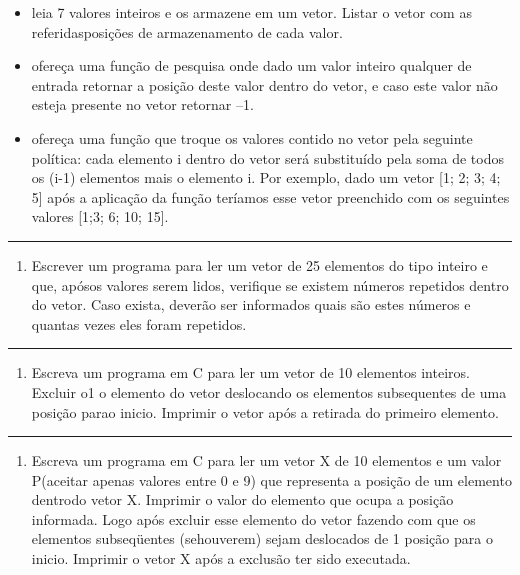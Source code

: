 \documentclass[12pt,a4paper]{article}
\renewcommand{\linethickness}{0.05em}
\providecommand{\tightlist}{%
      \setlength{\itemsep}{0pt}\setlength{\parskip}{0pt}}
\begin{document}
\begin{itemize}
\tightlist
\item
  leia 7 valores inteiros e os armazene em um vetor. Listar o vetor com
  as referidasposições de armazenamento de cada valor.
\item
  ofereça uma função de pesquisa onde dado um valor inteiro qualquer de
  entrada retornar a posição deste valor dentro do vetor, e caso este
  valor não esteja presente no vetor retornar --1.
\item
  ofereça uma função que troque os valores contido no vetor pela
  seguinte política: cada elemento i dentro do vetor será substituído
  pela soma de todos os (i-1) elementos mais o elemento i. Por exemplo,
  dado um vetor {[}1; 2; 3; 4; 5{]} após a aplicação da função teríamos
  esse vetor preenchido com os seguintes valores {[}1;3; 6; 10; 15{]}.
\end{itemize}

    \begin{center}\rule{0.5\linewidth}{\linethickness}\end{center}

\begin{enumerate}
\def\labelenumi{\arabic{enumi}.}
\setcounter{enumi}{17}
\tightlist
\item
  Escrever um programa para ler um vetor de 25 elementos do tipo inteiro
  e que, apósos valores serem lidos, verifique se existem números
  repetidos dentro do vetor. Caso exista, deverão ser informados quais
  são estes números e quantas vezes eles foram repetidos.
\end{enumerate}

    \begin{center}\rule{0.5\linewidth}{\linethickness}\end{center}

\begin{enumerate}
\def\labelenumi{\arabic{enumi}.}
\setcounter{enumi}{18}
\tightlist
\item
  Escreva um programa em C para ler um vetor de 10 elementos inteiros.
  Excluir o1 o elemento do vetor deslocando os elementos subsequentes de
  uma posição parao inicio. Imprimir o vetor após a retirada do primeiro
  elemento.
\end{enumerate}

    \begin{center}\rule{0.5\linewidth}{\linethickness}\end{center}

\begin{enumerate}
\def\labelenumi{\arabic{enumi}.}
\setcounter{enumi}{19}
\tightlist
\item
  Escreva um programa em C para ler um vetor X de 10 elementos e um
  valor P(aceitar apenas valores entre 0 e 9) que representa a posição
  de um elemento dentrodo vetor X. Imprimir o valor do elemento que
  ocupa a posição informada. Logo após excluir esse elemento do vetor
  fazendo com que os elementos subseqüentes (sehouverem) sejam
  deslocados de 1 posição para o inicio. Imprimir o vetor X após a
  exclusão ter sido executada.
\end{enumerate}
\end{document}
